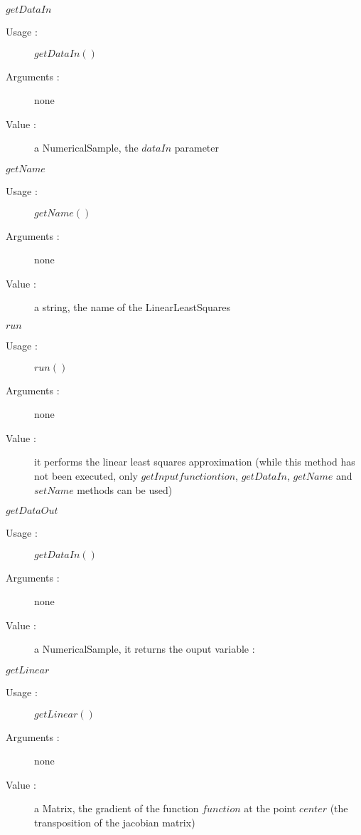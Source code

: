 \begin{description}
\begin{description}
  \item $getDataIn$
    \begin{description}
    \item[Usage :] $getDataIn()$
    \item[Arguments :] none
    \item[Value :] a NumericalSample, the $dataIn$ parameter
    \end{description}
    \bigskip

  \item $getName$
    \begin{description}
    \item[Usage :] $getName()$
    \item[Arguments :] none
    \item[Value :] a string, the name of the LinearLeastSquares
    \end{description}
    \bigskip


  \item $run$
    \begin{description}
    \item[Usage :] $run()$
    \item[Arguments :] none
    \item[Value :] it performs the linear least squares approximation (while this method has not been executed, only $getInputfunctiontion$, $getDataIn$, $getName$ and $setName$ methods can be used)
    \end{description}
    \bigskip


  \item $getDataOut$
    \begin{description}
    \item[Usage :] $getDataIn()$
    \item[Arguments :] none
    \item[Value :] a NumericalSample, it returns the ouput variable :
    \end{description}
    \bigskip

  \item $getLinear$
    \begin{description}
    \item[Usage :] $getLinear()$ %
    \item[Arguments :] none
    \item[Value :] a Matrix, the gradient of the function $function$ at the point $center$ (the transposition of the jacobian matrix)
    \end{description}
    \bigskip


\end{description}
\end{description}

